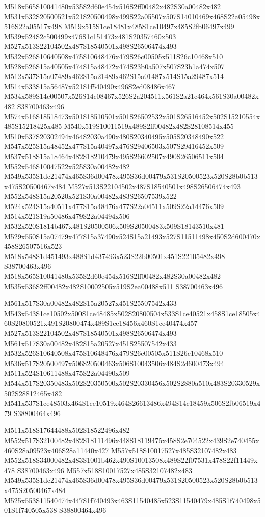 \documentclass{article}
\begin{document}
\begin{multicols}{2}
M518x565S10041480x535S2d60e454x516S2ff00482x482S30a00482x482 M531x532S20500521x521S20500498x499S22a05507x507S14010469x468S22a05498x516S22a05517x498 M519x515S1ce18481x485S1ce10497x485S2fb06497x499 M539x524S2c500499x476S1c151473x481S20357460x503 M527x513S22104502x487S18540501x498S26506474x493 M532x526S10640508x475S10648476x479S26c00505x511S26c10468x510 M528x526S15a40505x474S15a48472x474S23b0a507x507S23b1a474x507 M512x537S15a07489x462S15a21489x462S15a01487x514S15a29487x514 M514x533S15a56487x521S1f540490x496S2ed08486x467 M534x589S14c00507x526S14c08467x526S2a204511x561S2a21c464x561S30a00482x482 S38700463x496 M574x516S18518473x501S18510501x501S26502532x501S26516452x502S15210554x485S15218425x485 M540x519S10011519x489S2ff00482x482S28108514x455 M510x537S20302494x464S2030a490x480S20340495x505S20348490x522 M547x525S15a48452x477S15a40497x476S29406503x507S29416452x509 M537x518S15a18464x482S18210479x495S26602507x490S26506511x504 M552x546S10047522x525S30a00482x482 M549x535S1dc21474x465S36d00478x495S36d00479x531S20500523x520S28b0b513x475S20500467x484 M527x513S22104502x487S18540501x498S26506474x493 M552x548S15a20520x521S30a00482x483S26507539x522 M524x524S15a40511x477S15a48476x477S22a04511x509S22a14476x509 M514x521S19a50486x479S22a04494x506 M532x520S1814b467x481S20500506x509S20500483x509S18143510x481 M529x550S15a07479x477S15a37490x524S15a21493x527S11511498x450S2d600470x458S26507516x523 M518x548S1d451493x488S1d437493x523S22b00501x451S22105482x498 S38700463x496 M518x565S10041480x535S2d60e454x516S2ff00482x482S30a00482x482 M535x536S2ff00482x482S10002505x519S2ea00488x511 S38700463x496

M561x517S30a00482x482S15a20527x451S25507542x433 M543x543S1ce10502x500S1ce48485x502S20800504x533S1ce40521x458S1ce18505x460S20800521x491S20800474x489S1ce18456x460S1ce40474x457 M527x513S22104502x487S18540501x498S26506474x493 M561x517S30a00482x482S15a20527x451S25507542x433 M532x526S10640508x475S10648476x479S26c00505x511S26c10468x510 M536x517S20500497x506S20500463x506S10043506x484S2d600473x494 M511x524S10611488x475S22a04490x509 M544x517S20350483x502S20350500x502S20330456x502S2880a510x483S20330529x502S28812465x482 M541x537S1ce48503x464S1ce10519x464S26613486x494S14c18459x506S2fb06519x479 S38800464x496

M511x518S17644488x502S18522496x482 M552x517S32100482x482S18111496x448S18119475x458S2e704522x439S2e740455x460S28a09523x406S28a11440x427 M557x518S10017527x485S32107482x483 M552x518S34000482x483S1001b462x490S10013508x489S22f07531x478S22f11449x478 S38700463x496 M557x518S10017527x485S32107482x483 M549x535S1dc21474x465S36d00478x495S36d00479x531S20500523x520S28b0b513x475S20500467x484 M525x553S11540474x447S1f740493x463S11540485x523S11540479x485S1f740498x501S1f740505x538 S38800464x496


\end{multicols}
\end{document}
